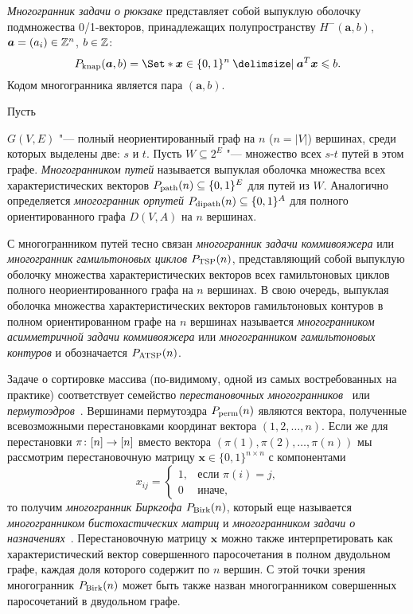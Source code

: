 \emph{Многогранник задачи о рюкзаке} представляет собой выпуклую оболочку подмножества 0/1-векторов,
принадлежащих полупространству $H^-(\bm{a}, b)$, $\bm{a} = (a_i) \in \mathbb{Z}^n$, $b \in \mathbb{Z}$:
\begin{equation}
\label{eq:KNAP}
\Knap(\bm{a},b) = \Set*{\bm{x} \in \{0,1\}^{n} \given \bm{a}^T \bm{x} \le b}.
\end{equation}
Кодом многогранника является пара $(\bm{a},b)$.

\hypertarget{def:PathPolytope}{Пусть} $G(V,E)$ "--- полный неориентированный граф на $n$ ($n=|V|$) вершинах, среди которых выделены две: $s$ и $t$.
Пусть $W \subseteq 2^E$ "--- множество всех $s$-$t$ путей в этом графе.
\emph{Многогранником путей} называется выпуклая оболочка множества всех характеристических векторов $P_{\textup{path}}(n) \subseteq \{0,1\}^E$ для путей из $W$.
Аналогично определяется \emph{многогранник орпутей} $P_{\textup{dipath}}(n) \subseteq \{0,1\}^A$ для полного ориентированного графа $D(V,A)$ на $n$ вершинах.

С многогранником путей тесно связан \emph{многогранник задачи коммивояжера} или
\label{def:TSP}
\emph{многогранник гамильтоновых циклов} %
$P_{\textup{TSP}}(n)$, представляющий собой выпуклую оболочку множества характеристических векторов всех гамильтоновых циклов полного неориентированного графа на $n$ вершинах.
В свою очередь, выпуклая оболочка множества характеристических векторов гамильтоновых контуров в полном ориентированном графе на $n$ вершинах называется \emph{многогранником асимметричной задачи коммивояжера} или \emph{многогранником гамильтоновых контуров} и обозначается $P_{\textup{ATSP}}(n)$.

Задаче о сортировке массива (по-видимому, одной из самых востребованных на практике) соответствует семейство \emph{перестановочных многогранников}~\cite{Emelichev:1981} или \emph{пермутоэдров}~\cite{ZieglerBook}.\label{def:perm-birk}
Вершинами пермутоэдра $P_{\textup{perm}}(n)$ являются вектора,
полученные всевозможными перестановками координат вектора $(1, 2, \dots, n)$.
Если же для перестановки $\pi \colon [n] \to [n]$
вместо вектора $(\pi(1), \pi(2), \dots, \pi(n))$
мы рассмотрим перестановочную матрицу $\bm{x} \in \{0,1\}^{n\times n}$ с компонентами
\[
x_{ij} = \begin{cases}
1,& \text{если $\pi(i) = j$,}\\
0& \text{иначе,}
\end{cases}
\]
то получим \emph{многогранник Биркгофа} $P_{\textup{Birk}}(n)$, который еще называется \emph{многогранником бистохастических матриц} и \emph{многогранником задачи о назначениях}~\cite{Emelichev:1981}.
Перестановочную матрицу $\bm{x}$ можно также интерпретировать как характеристический вектор совершенного паросочетания в полном двудольном графе,
каждая доля которого содержит по $n$ вершин. 
С этой точки зрения многогранник $P_{\textup{Birk}}(n)$ может быть также назван многогранником совершенных паросочетаний в двудольном графе.

